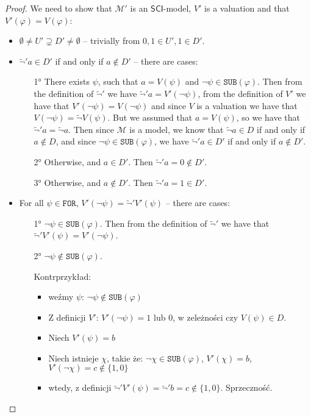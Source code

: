 \documentclass{article}
\theoremstyle{definition}
\theoremstyle{definition}
\newcommand*{\FOR}{\texttt{FOR}}
\newcommand*{\SUB}{\texttt{SUB}}
\newcommand{\SCI}{$\mathsf{SCI}$\xspace}
\begin{document}
\begin{proof}
    We need to show that $\mathcal{M'}$ is an \SCI-model, $V'$ is a valuation and
    that $V'(\varphi) = V(\varphi)$:
    \begin{itemize}
        \item $\emptyset \not = U' \supsetneq D' \not = \emptyset$ -- trivially from $0, 1 \in U', 1 \in D'$.
        \item $\tilde{\lnot}'a \in D'$ if and only if $a \not \in D'$ -- there are cases:
              \begin{enumerate}
                  \item[1°] There exists $\psi$, such that $a = V(\psi)$ and $\lnot \psi \in \SUB(\varphi)$. Then from the definition of $\tilde{\lnot}'$ we have $\tilde{\lnot}'a = V'(\lnot \psi)$, from the definition of $V'$ we have that $V'(\lnot \psi) = V(\lnot \psi)$ and since $V$ is a valuation we have that $V(\lnot \psi) = \tilde{\lnot}V(\psi)$. But we assumed that $a = V(\psi)$, so we have that $\tilde{\lnot}'a = \tilde{\lnot}a$. Then since $\mathcal{M}$ is a model, we know that $\tilde{\lnot}a \in D$ if and only if $a \not \in D$, and since $\lnot\psi \in \SUB(\varphi)$, we have $\tilde{\lnot}'a \in D'$ if and only if $a \not \in D'$.
                  \item[2°] Otherwise, and $a \in D'$. Then $\tilde{\lnot}'a = 0 \not \in D'$.
                  \item[3°] Otherwise, and $a \not \in D'$. Then $\tilde{\lnot}'a = 1 \in D'$.
              \end{enumerate}
        \item For all $\psi \in \FOR$, $V'(\lnot \psi) = \tilde{\lnot}'V'(\psi)$ -- there are
              cases:
              \begin{enumerate}
                  \item[1°] $\lnot \psi \in \SUB(\varphi)$. Then from the definition of $\tilde{\lnot}'$ we have that $\tilde{\lnot}'V'(\psi) = V'(\lnot \psi)$.
                  \item[2°] $\lnot \psi \not \in \SUB(\varphi)$.

                          {\color{red} Kontrprzykład:
                              \begin{itemize}
                                  \item weźmy $\psi$: $\lnot \psi \not \in \SUB(\varphi)$
                                  \item Z definicji $V'$: $V'(\lnot \psi) = 1 $ lub $0$, w zeleżności czy $V(\psi) \in
                                            D$.
                                  \item Niech $V'(\psi) = b$
                                  \item Niech istnieje $\chi$, takie że: $\lnot \chi \in \SUB(\varphi)$, $V'(\chi) =
                                            b$, $V'(\lnot \chi) = c \not \in \{1, 0\}$
                                  \item wtedy, z definicji $\tilde{\lnot}'V'(\psi) = \tilde{\lnot}'b = c \not \in \{1,
                                            0\}.$ Sprzeczność.
                              \end{itemize}

}
\end{enumerate}
\end{itemize}
\end{proof}
\end{document}
